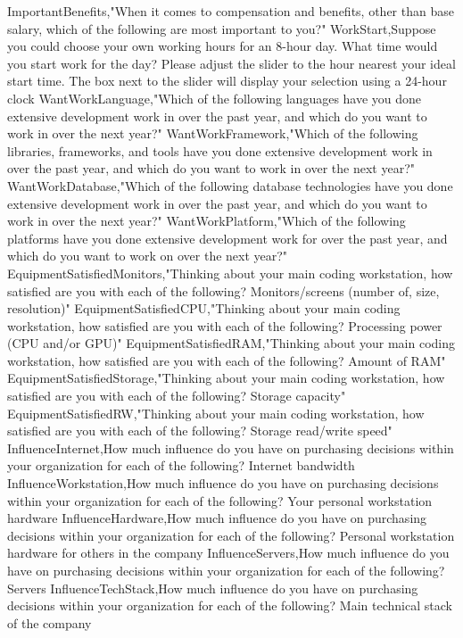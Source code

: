 \begin{appendices}
ImportantBenefits,"When it comes to compensation and benefits, other than base salary, which of the following are most important to you?"
WorkStart,Suppose you could choose your own working hours for an 8-hour day. What time would you start work for the day? Please adjust the slider to the hour nearest your ideal start time. The box next to the slider will display your selection using a 24-hour clock
WantWorkLanguage,"Which of the following languages have you done extensive development work in over the past year, and which do you want to work in over the next year?"
WantWorkFramework,"Which of the following libraries, frameworks, and tools have you done extensive development work in over the past year, and which do you want to work in over the next year?"
WantWorkDatabase,"Which of the following database technologies have you done extensive development work in over the past year, and which do you want to work in over the next year?"
WantWorkPlatform,"Which of the following platforms have you done extensive development work for over the past year, and which do you want to work on over the next year?"
EquipmentSatisfiedMonitors,"Thinking about your main coding workstation, how satisfied are you with each of the following? Monitors/screens (number of, size, resolution)"
EquipmentSatisfiedCPU,"Thinking about your main coding workstation, how satisfied are you with each of the following? Processing power (CPU and/or GPU)"
EquipmentSatisfiedRAM,"Thinking about your main coding workstation, how satisfied are you with each of the following? Amount of RAM"
EquipmentSatisfiedStorage,"Thinking about your main coding workstation, how satisfied are you with each of the following? Storage capacity"
EquipmentSatisfiedRW,"Thinking about your main coding workstation, how satisfied are you with each of the following? Storage read/write speed"
InfluenceInternet,How much influence do you have on purchasing decisions within your organization for each of the following? Internet bandwidth
InfluenceWorkstation,How much influence do you have on purchasing decisions within your organization for each of the following? Your personal workstation hardware
InfluenceHardware,How much influence do you have on purchasing decisions within your organization for each of the following? Personal workstation hardware for others in the company
InfluenceServers,How much influence do you have on purchasing decisions within your organization for each of the following? Servers
InfluenceTechStack,How much influence do you have on purchasing decisions within your organization for each of the following? Main technical stack of the company

\end{appendices}

